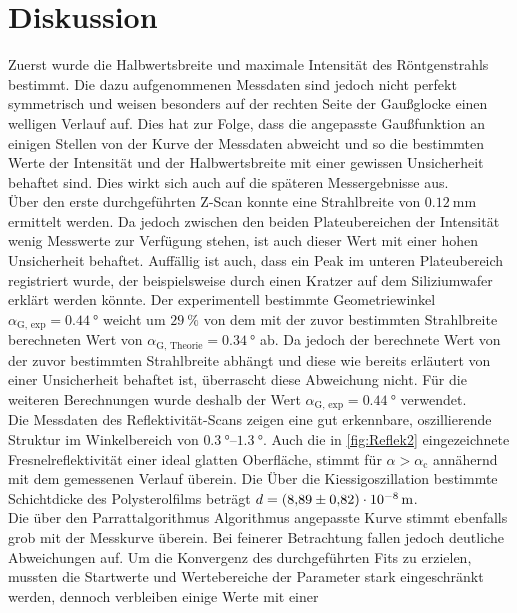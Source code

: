 \section{Diskussion}
\label{sec:Diskussion}
Zuerst wurde die Halbwertsbreite und maximale Intensität des Röntgenstrahls bestimmt. Die dazu aufgenommenen Messdaten sind jedoch nicht perfekt symmetrisch und weisen 
besonders auf der rechten Seite der Gaußglocke einen welligen Verlauf auf. Dies hat zur Folge, dass die angepasste Gaußfunktion an einigen Stellen von der Kurve der 
Messdaten abweicht und so die bestimmten Werte der Intensität und der Halbwertsbreite mit einer gewissen Unsicherheit behaftet sind. Dies wirkt sich auch auf die späteren
Messergebnisse aus.\\
Über den erste durchgeführten Z-Scan konnte eine  Strahlbreite von $\qty{0.12}{\milli\metre}$ ermittelt werden. Da jedoch zwischen den beiden Plateubereichen der Intensität 
wenig Messwerte zur Verfügung stehen, ist auch dieser Wert mit einer hohen Unsicherheit behaftet. Auffällig ist auch, dass ein Peak im unteren Plateubereich registriert wurde,
der beispielsweise durch einen Kratzer auf dem Siliziumwafer erklärt werden könnte. 
Der experimentell bestimmte Geometriewinkel $\alpha_\text{G, exp} = \qty{0.44}{\degree}$ weicht um $\qty{29}{\percent}$ von dem mit der zuvor bestimmten Strahlbreite 
berechneten Wert von $\alpha_\text{G, Theorie} = \qty{0.34}{\degree}$ ab. Da jedoch der berechnete Wert von der zuvor bestimmten Strahlbreite abhängt und diese wie bereits 
erläutert von einer Unsicherheit behaftet ist, überrascht diese Abweichung nicht. Für die weiteren Berechnungen wurde deshalb der Wert 
$\alpha_\text{G, exp} = \qty{0.44}{\degree}$ verwendet. \\
Die Messdaten des Reflektivität-Scans zeigen eine gut erkennbare, oszillierende Struktur im Winkelbereich von $\qtyrange{0.3}{1.3}{\degree}$. Auch die in \autoref{fig:Reflek2}
eingezeichnete Fresnelreflektivität einer ideal glatten Oberfläche, stimmt für $\alpha > \alpha_\text{c}$ annähernd mit dem gemessenen Verlauf überein. Die Über die 
Kiessigoszillation bestimmte Schichtdicke des Polysterolfilms beträgt $d = \qty{8.89 +- 0.82e-8}{\metre}$.\\
Die über den Parrattalgorithmus Algorithmus angepasste Kurve stimmt ebenfalls grob mit der Messkurve überein. Bei feinerer Betrachtung fallen jedoch deutliche Abweichungen auf.
Um die Konvergenz des durchgeführten Fits zu erzielen, mussten die Startwerte und Wertebereiche der Parameter stark eingeschränkt werden, dennoch verbleiben einige Werte mit einer 
